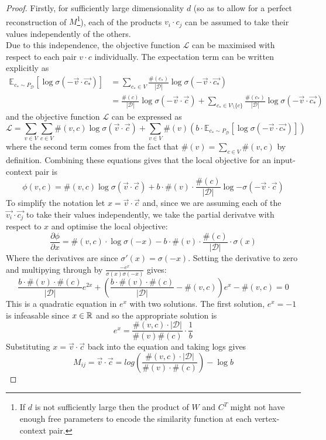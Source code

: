 \documentclass[a4paper]{article}
\renewcommand{\E}{\mathbb E}
\newcommand{\D}{\mathcal D}
\begin{document}
\begin{proof}
  Firstly, for sufficiently large dimensionality $d$ (so as to allow for a perfect
  reconstruction of $M$\footnote{If $d$ is not sufficiently large then the product of $W$ and $C^T$ might not have enough free parameters to encode the similarity function at each vertex-context pair.}), each of the products $v_i \cdot c_j$ can be assumed to
  take their values independently of the others.\\
  Due to this independence, the objective function $\mathcal{L}$ can be maximised with
  respect to each pair $v \cdot c$ individually. The expectation term can be written explicitly as
  \begin{align*}
    \E_{c_* \sim P_{\D}}[\log{\sigma(-\vec{v} \cdot \vec{c_*})}] &= \sum_{c_* \in V}{\frac{\#(c_*)}{|\D|} \log{\sigma(-\vec{v} \cdot \vec{c_*})}}\\
                                                                             &= \frac{\#(c)}{|\D|} \log{\sigma(-\vec{v} \cdot \vec{c})} + \sum_{c_*\in V \setminus \{c\}}{\frac{\#(c_*)}{|\D|} \log{\sigma(-\vec{v} \cdot \vec{c_*})}}
  \end{align*}
  and the objective function $\mathcal{L}$ can be expressed as
  \begin{equation*}
    \mathcal{L} =  \sum_{v \in V}\sum_{c \in V}\#(v, c)\log{\sigma(\vec{v} \cdot \vec{c})} + \sum_{v \in V}\#(v)\left(b \cdot \E_{c _* \sim P_{\D}}[\log{\sigma(-\vec{v} \cdot \vec{c_*})}] \right)
  \end{equation*}
  where the second term comes from the fact that $\#(v) = \sum_{c \in V}\#(v,c)$
  by definition. Combining these equations gives that the local objective for an input-context
  pair is
  \begin{equation*}
    \phi(v, c) = \#(v, c)\log{\sigma(\vec{v} \cdot \vec{c})} + b \cdot \#(v)\cdot \frac{\#(c)}{|\D|}\log{-\sigma(-\vec{v} \cdot \vec{c})} 
  \end{equation*}
  To simplify the notation let $x = \vec{v} \cdot \vec{c}$ and, since we are
  assuming each of the $\vec{v_i} \cdot \vec{c_j}$ to take their values
  independently, we take the partial derivatve with respect to $x$ and optimise
  the local objective:
  \[\frac{\partial{\phi}}{\partial{x}} = \#(v, c) \cdot \log{\sigma(-x)} - b \cdot
    \#(v) \cdot \frac{\#(c)}{|\D|} \cdot \sigma(x)\]
  Where the derivatives are since $\sigma'(x) = \sigma(-x)$. Setting
  the derivative to zero and multipying through by
  $\frac{-e^x}{\sigma(x)\sigma(-x)}$ gives:
  \[\frac{b \cdot \#(v) \cdot \#(c)}{|\D|}e^{2x} + \left( \frac{b \cdot \#(v)
        \cdot \#(c)}{|\D|} - \#(v, c) \right)e^x - \#(v, c) = 0\]
  This is a quadratic equation in $e^x$ with two solutions. The first solution,
  $e^x = -1$ is infeasable since $x \in \R$ and so the appropriate solution is
  \[e^x = \frac{\#(v,c) \cdot |\D|}{\#(v)\#(c)} \cdot \frac{1}{b}\]
  Substituting $x = \vec{v} \cdot \vec{c}$ back into the equation and taking
  logs gives
  \[M_{ij} = \vec{v} \cdot \vec{c} = log{\left( \frac{\#(v, c) \cdot |\D|}{\#(v) \cdot
          \#(c)} \right)} - \log{b}\]
\end{proof}
\end{document}

